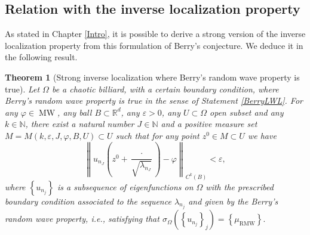 \documentclass{amsart}
\newtheorem{theorem}{Theorem}[section]
\theoremstyle{definition}
\theoremstyle{remark}
\newcommand{\ep}{\varepsilon}
\newcommand{\vp}{\varphi}
\newcommand{\Om}{\Omega}
\def\RR{\mathbb{R}}
\numberwithin{equation}{section}
\theoremstyle{definition}
\theoremstyle{remark}
\def\RR{\mathbb{R}}
\DeclareMathOperator\MW{MW}
\newcommand\muRMW{\mu_{\mathrm{RMW}}}
\begin{document}
\subsection{Relation with the inverse localization property}
As stated in Chapter \ref{Intro}, it is possible to derive a strong version of the inverse localization property from this formulation of Berry's conjecture. We deduce it in the following result.
\begin{theorem}[Strong inverse localization where Berry's random wave property is true]\label{ILBerry}
	Let $\Omega$ be a chaotic billiard, with a certain boundary condition, where Berry's random wave property is true in the sense of Statement \ref{BerryLWL}. For any $\vp\in\MW$, any ball $B\subset\RR^d$, any $\ep>0$, any $U\subset\Omega$ open subset and any $k\in\mathbb{N}$, there exist a natural number $J\in\mathbb{N}$ and a positive measure set $M=M(k,\ep,J,\varphi,B, U)\subset U$ such that for any point $z^0\in M\subset U$ we have \begin{equation}
		\left\|u_{n_J}\left(z^0+\frac{\cdot}{\sqrt{\lambda_{n_J}}}\right)-\vp\right\|_{C^k(B)}<\ep,
	\end{equation}where $\left\{u_{n_j}\right\}$ is a subsequence of eigenfunctions on $\Om$ with the prescribed boundary condition associated to the sequence $\lambda_{n_j}$ and given by the Berry's random wave property, i.e., satisfying that $	\sigma_\Omega\left(\left\{u_{n_j}\right\}_j\right)=\left\{\muRMW\right\}.$
\end{theorem}
\end{document}
